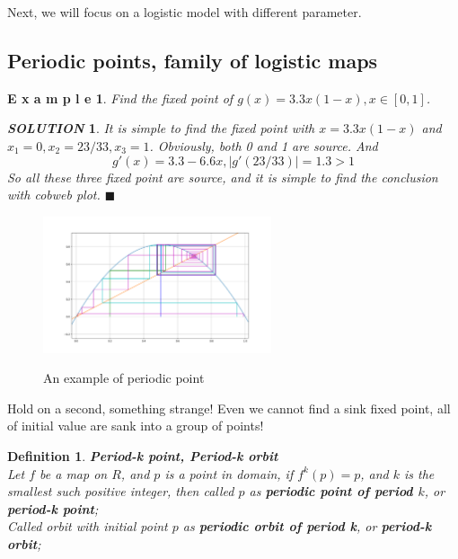 \documentclass[12pt]{article}
\theoremstyle{plain}
\newtheorem{definition}{{\color{red}\textbf{Definition}}}[section]
\newtheorem{example}{\textbf{E x a m p l e}}[section]
\newtheorem{solution}{\textit{SOLUTION}}[section]
\begin{document}
Next, we will focus on a logistic model with different parameter.








\subsection{Periodic points, family of logistic maps}
\begin{example} Find the fixed point of $g(x) = 3.3x(1-x), x \in [0, 1]$.
\end{example}

{\color{blue}
\begin{solution}
It is simple to find the fixed point with $x = 3.3x(1-x)$ and $x_1 = 0, x_2 = 23/33, x_3 = 1$. Obviously, both 0 and 1 are source. And
$$
g'(x) = 3.3 - 6.6x, |g'(23/33)| = 1.3 > 1
$$ 
So all these three fixed point are source, and it is simple to find the conclusion with cobweb plot. $\blacksquare$
\end{solution}
}

\newpage
\begin{figure}[H]
\begin{center}
\includegraphics[width=0.6\textwidth]{figure/section1/periodic-point.png} \\
\caption{An example of periodic point}\label{periodic-point}
\end{center}
\end{figure}


Hold on a second, something strange! Even we cannot find a sink fixed point, all of initial value are sank into a group of points!

\begin{definition}\textbf{Period-k point, Period-k orbit}
\\\noindent Let $f$ be a map on $R$, and $p$ is a point in domain, if $f^k(p) = p$, and $k$ is the smallest such positive integer, then called $p$ as \textbf{periodic point of period $k$}, or \textbf{period-k point};
\\\noindent Called orbit with initial point $p$ as \textbf{periodic orbit of period k}, or \textbf{period-k orbit};
\end{definition}
\end{document}
